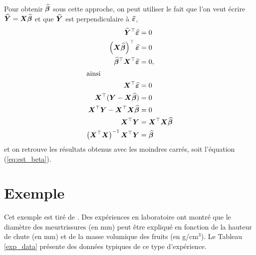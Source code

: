 Pour obtenir $\widehat{\bm\beta}$ sous cette approche, on peut utiliser le fait que l'on veut écrire $\widehat{\bm{Y}} = \bm{X} \widehat{\bm\beta}$ et que $\widehat{\bm{Y}}$ est perpendiculaire à $\widehat{\bm\varepsilon}$,
\begin{align*}
    \widehat{\bm{Y}}^\top \widehat{\bm\varepsilon} &= 0 \\
    \left(\bm{X} \widehat{\bm\beta}\right)^\top \widehat{\bm\varepsilon} &= 0  \\
     \widehat{\bm\beta}^\top \bm{X}^\top \widehat{\bm\varepsilon} &= 0,  \\
 \intertext{ainsi}    
    \bm{X}^\top \widehat{\bm\varepsilon} &= 0  \\
    \bm{X}^\top(\bm{Y}-\bm{X}\widehat{\bm\beta}) &= 0 \\
    \bm{X}^\top\bm{Y} - \bm{X}^\top\bm{X}\widehat{\bm\beta} &= 0 \\
    \bm{X}^\top\bm{Y} &= \bm{X}^\top\bm{X}\widehat{\bm\beta}  \\
    \left(\bm{X}^\top\bm{X}\right)^{-1}\bm{X}^\top\bm{Y} &= \widehat{\bm\beta}  
\end{align*}
et on retrouve les résultats obtenus avec les moindres carrés, soit l'équation (\ref{eq:est_beta}).






\section{Exemple}

Cet exemple est tiré de \citet[][Exemple 14.1]{Hin_Mon_Gol_Bor:12}.
Des expériences en laboratoire ont montré que le diamètre des meurtrissures (en mm) peut être expliqué en fonction de la hauteur de chute (en mm) et de la masse volumique des fruits (en g/cm$^3$). Le Tableau \ref{exp_data} présente des données typiques de ce type d'expérience.


